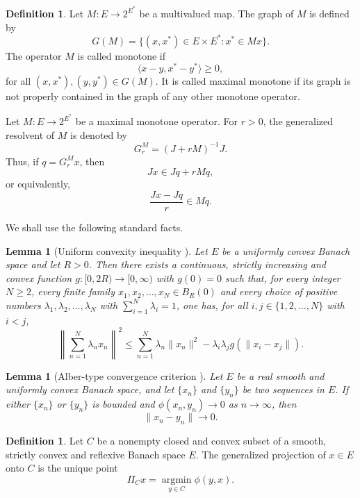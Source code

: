 \documentclass[leqno,12pt]{amsart}
\newtheorem{lemma}[theorem]{Lemma}
\theoremstyle{definition}
\newtheorem{definition}[theorem]{Definition}
\numberwithin{equation}{section}
\begin{document}
\begin{definition}
Let $M:E\to 2^{E^{*}}$ be a multivalued map. The graph of $M$ is defined by
\[
G(M)=\{(x,x^{*})\in E\times E^{*}:x^{*}\in Mx\}.
\]
The operator $M$ is called monotone if
\[
\langle x-y,x^{*}-y^{*}\rangle\geq 0,
\]
for all $(x,x^{*}),(y,y^{*})\in G(M)$. It is called maximal monotone if its graph is not properly contained in the graph of any other monotone operator.
\end{definition}

Let $M:E\to 2^{E^{*}}$ be a maximal monotone operator. For $r>0$, the generalized resolvent of $M$ is denoted by
\[
G_r^M=(J+rM)^{-1}J.
\]
Thus, if $q=G_r^Mx$, then
\begin{equation}\label{resolventidentity}
Jx\in Jq+rMq,
\end{equation}
or equivalently,
\[
\frac{Jx-Jq}{r}\in Mq.
\]

We shall use the following standard facts. %


\begin{lemma}[Uniform convexity inequality \cite{KamimuraTakahashi2002}]\label{glemma}
Let $E$ be a uniformly convex Banach space and let $R>0$. Then there exists a continuous, strictly increasing and convex function $g:[0,2R)\to[0,\infty)$ with $g(0)=0$ such that, for every integer $N\geq2$, every finite family $x_1,x_2,\ldots,x_N\in B_R(0)$ and every choice of positive numbers $\lambda_1,\lambda_2,\ldots,\lambda_N$ with $\sum_{i=1}^{N}\lambda_i=1$, one has, for all $i,j\in\{1,2,\ldots,N\}$ with $i<j$,
\[
\left\|\sum_{n=1}^{N}\lambda_nx_n\right\|^2\leq \sum_{n=1}^{N}\lambda_n\|x_n\|^2-\lambda_i\lambda_jg(\|x_i-x_j\|).
\]
\end{lemma}

\begin{lemma}[Alber-type convergence criterion \cite{Alber1996,KamimuraTakahashi2002}]\label{phitozero}
Let $E$ be a real smooth and uniformly convex Banach space, and let $\{x_n\}$ and $\{y_n\}$ be two sequences in $E$. If either $\{x_n\}$ or $\{y_n\}$ is bounded and $\phi(x_n,y_n)\to 0$ as $n\to\infty$, then
\[
\|x_n-y_n\|\to 0.
\]
\end{lemma}


\begin{definition}
Let $C$ be a nonempty closed and convex subset of a smooth, strictly convex and reflexive Banach space $E$. The generalized projection of $x\in E$ onto $C$ is the unique point
\[
\Pi_Cx=\operatorname*{argmin}_{y\in C}\phi(y,x).
\]
\end{definition}
\end{document}
